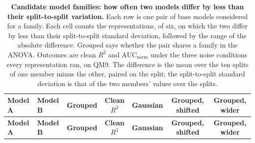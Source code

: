 
{\scriptsize
\begin{longtable}{lllcccc}
\caption{\textbf{\SuppFile{} Candidate model families: how often two models differ by less than their split-to-split variation.}
Each row is one pair of base models considered for a family. Each cell counts the representations, of six, on which the two differ by less than their split-to-split standard deviation, followed by the range of the absolute difference. Grouped says whether the pair shares a family in the ANOVA. Outcomes are clean $R^2$ and AUC$_\mathrm{norm}$ under the three noise conditions every representation ran, on QM9. The difference is the mean over the ten splits of one member minus the other, paired on the split; the split-to-split standard deviation is that of the two members' values over the splits.}
\label{supp:family_pairs_models}\\
\toprule
\textbf{Model A} & \textbf{Model B} & \textbf{Grouped} & \textbf{Clean $R^2$} & \textbf{Gaussian} & \textbf{Grouped, shifted} & \textbf{Grouped, wider} \\
\midrule
\endfirsthead
\toprule
\textbf{Model A} & \textbf{Model B} & \textbf{Grouped} & \textbf{Clean $R^2$} & \textbf{Gaussian} & \textbf{Grouped, shifted} & \textbf{Grouped, wider} \\
\midrule
\endhead

\bottomrule
\end{longtable}}
